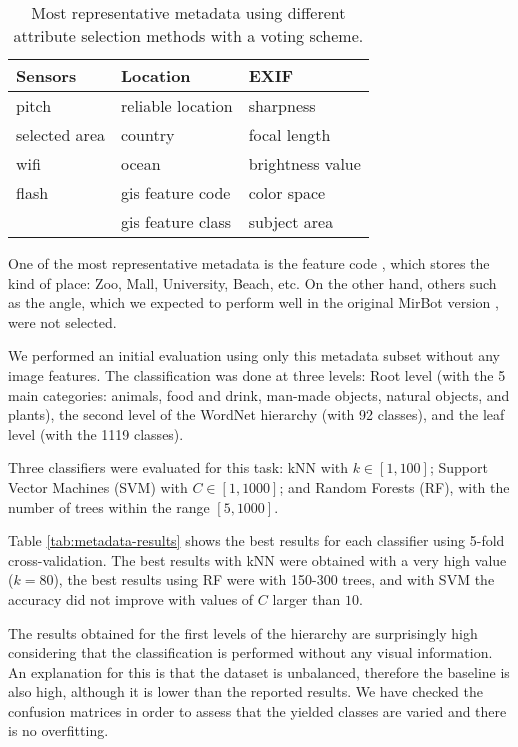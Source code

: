 \documentclass[final, twocolumn]{elsarticle}
\begin{document}
\begin{table}
\centering
\footnotesize
\begin{tabular}{lll}
\hline
\textbf{Sensors} & \textbf{Location}  & \textbf{EXIF}    \\ \hline
pitch           & reliable location  & sharpness        \\
selected area   & country            & focal length     \\
wifi            & ocean              & brightness value \\
flash           & gis feature code   & color space      \\
                & gis feature class  & subject area     \\
\hline
\end{tabular}
\caption{Most representative metadata using different attribute selection methods with a voting scheme.}
\label{tab:metadata-selected}
\end{table}

One of the most representative metadata is the feature code \cite{feat_codes}, which stores the kind of place: Zoo, Mall, University, Beach, etc. On the other hand, others such as the angle, which we expected to perform well in the original MirBot version \cite{MirBot:System}, were not selected.

We performed an initial evaluation using only this metadata subset without any image features. The classification was done at three levels: Root level (with the 5 main categories: animals, food and drink, man-made objects, natural objects, and plants), the second level of the WordNet hierarchy (with 92 classes), and the leaf level (with the 1119 classes).

Three classifiers were evaluated for this task: kNN with $k \in [1,100]$; Support Vector Machines (SVM) with $C \in [1,1000]$; and Random Forests (RF), with the number of trees within the range $[5,1000]$.

Table \ref{tab:metadata-results} shows the best results for each classifier using 5-fold cross-validation. The best results with kNN were obtained with a very high value ($k=80$), the best results using RF were with 150-300 trees, and with SVM the accuracy did not improve with values of $C$ larger than $10$.

The results obtained for the first levels of the hierarchy are surprisingly high considering that the classification is performed without any visual information. An explanation for this is that the dataset is unbalanced, therefore the baseline is also high, although it is lower than the reported results. We have checked the confusion matrices in order to assess that the yielded classes are varied and there is no overfitting.
\end{document}
